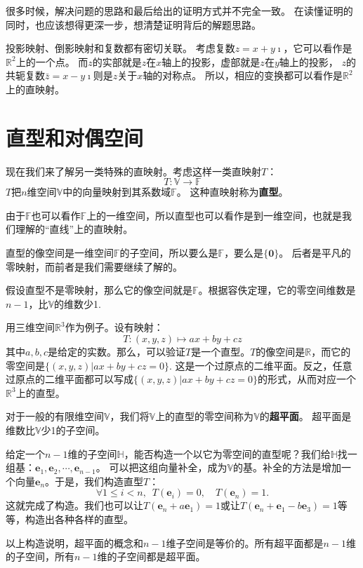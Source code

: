 \documentclass[12pt,UTF8,fontset=none]{ctexbook}
\begin{document}
很多时候，解决问题的思路和最后给出的证明方式并不完全一致。
在读懂证明的同时，也应该想得更深一步，想清楚证明背后的解题思路。

投影映射、倒影映射和复数都有密切关联。
考虑复数$z = x+y\imath $，它可以看作是$\mathbb{R}^2$上的一个点。
而$z$的实部就是$z$在$x$轴上的投影，虚部就是$z$在$y$轴上的投影，
$z$的共轭复数$\bar{z}=x-y\imath $则是$z$关于$x$轴的对称点。
所以，相应的变换都可以看作是$\mathbb{R}^2$上的直映射。

\section{直型和对偶空间}
现在我们来了解另一类特殊的直映射。考虑这样一类直映射$T$：
$$  T : \mathbb{V} \rightarrow \mathbb{F}  $$
$T$把$n$维空间$\mathbb{V}$中的向量映射到其系数域$\mathbb{F}$。
这种直映射称为\textbf{直型}。

由于$\mathbb{F}$也可以看作$\mathbb{F}$上的一维空间，所以直型也可以看作是到一维空间，也就是我们理解的“直线”上的直映射。

直型的像空间是一维空间$\mathbb{F}$的子空间，所以要么是$\mathbb{F}$，要么是$\{\mathbf{0}\}$。
后者是平凡的零映射，而前者是我们需要继续了解的。

假设直型不是零映射，那么它的像空间就是$\mathbb{F}$。根据容佚定理，它的零空间维数是$n-1$，比$\mathbb{V}$的维数少1.

用三维空间$\mathbb{R}^3$作为例子。设有映射：
$$T : (x,y,z) \mapsto ax + by + cz$$
其中$a,b,c$是给定的实数。那么，可以验证$T$是一个直型。$T$的像空间是$\mathbb{R}$，而它的零空间是$\{(x,y,z) | ax+by+cz = 0\}$. 
这是一个过原点的二维平面。反之，任意过原点的二维平面都可以写成$\{(x,y,z) | ax+by+cz = 0\}$的形式，从而对应一个$\mathbb{R}^3$上的直型。

对于一般的有限维空间$\mathbb{V}$，我们将$\mathbb{V}$上的直型的零空间称为$\mathbb{V}$的\textbf{超平面}。
超平面是维数比$\mathbb{V}$少1的子空间。

给定一个$n-1$维的子空间$\mathbb{H}$，能否构造一个以它为零空间的直型呢？我们给$\mathbb{H}$找一组基：$\mathbf{e}_1, \mathbf{e}_2, \cdots, \mathbf{e}_{n-1}$。
可以把这组向量补全，成为$\mathbb{V}$的基。补全的方法是增加一个向量$\mathbf{e}_n$。于是，我们构造直型$T$：
$$ \forall 1 \leqslant i < n, \,\,\, T(\mathbf{e}_i)= 0, \quad T(\mathbf{e}_n)= 1. $$
这就完成了构造。我们也可以让$T(\mathbf{e}_n + a\mathbf{e}_1)= 1$或让$T(\mathbf{e}_n + \mathbf{e}_1 - b\mathbf{e}_3)= 1$等等，构造出各种各样的直型。

以上构造说明，超平面的概念和$n-1$维子空间是等价的。所有超平面都是$n-1$维的子空间，所有$n-1$维的子空间都是超平面。
\end{document}

